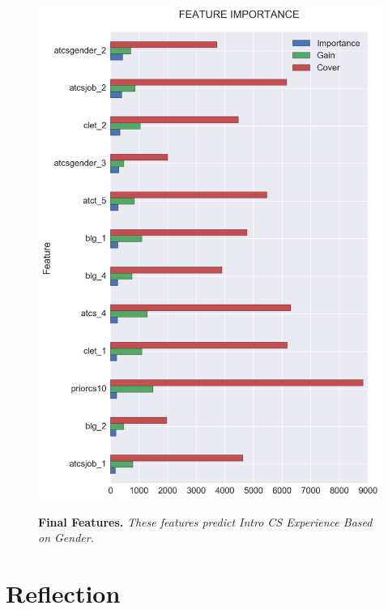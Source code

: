 \begin{figure}[!hbtp]
\centering

    \caption{\textbf{Final Features. }\textit{These features predict Intro CS Experience Based on Gender.}}

    \includegraphics[width=1\textwidth]{figures/final_importance.png}
    \label{finalImportance}
\end{figure}


\section*{Reflection}


